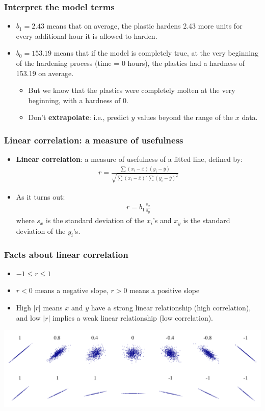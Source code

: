 \documentclass[handout]{beamer}\usepackage{graphicx, color}
\providecommand{\ov}[1]{\overline{#1}}
\numberwithin{equation}{section}
\begin{document}
\begin{frame}
\frametitle{Interpret the model terms}
\begin{itemize}
\item $b_1 = 2.43$ means that on average, the plastic hardens 2.43 more units for every additional hour it is allowed to harden.
\pause \item $b_0 = 153.19$ means that if the model is completely true, at the very beginning of the hardening process (time = 0 hours), the plastics had a hardness of 153.19 on average.
\begin{itemize}
\pause \item But we know that the plastics were completely molten at the very beginning, with a hardness of 0.
\pause \item Don't {\bf extrapolate}: i.e., predict $y$ values beyond the range of the $x$ data. 
\end{itemize}
\end{itemize}
\end{frame}


\begin{frame}
\frametitle{Linear correlation: a measure of usefulness}
\begin{itemize}
\item {\bf Linear correlation}: a measure of usefulness of a fitted line, defined by:
\pause \begin{align*}
r = \frac{\sum(x_i - \ov{x})(y_i - \ov{y})}{\sqrt{\sum (x_i - \ov{x})^2 \sum (y_i - \ov{y})^2}}
\end{align*}
\pause \item As it turns out:
\begin{align*}
r = b_1\frac{s_x}{s_y}
\end{align*}
where $s_x$ is the standard deviation of the $x_i$'s and $x_y$ is the standard deviation of the $y_i$'s. 
\end{itemize}
\end{frame}

\begin{frame}
\frametitle{Facts about linear correlation}
\begin{itemize}
\item $-1 \le r \le 1$
\pause \item $r < 0$ means a negative slope, $r > 0$ means a positive slope
\pause \item High $|r|$ means $x$ and $y$ have a strong linear relationship (high correlation), and low $|r|$ implies a weak linear relationship (low correlation).
\end{itemize}

 \includegraphics{../../fig/diffcorrs.png}
\end{frame}
\end{document}
